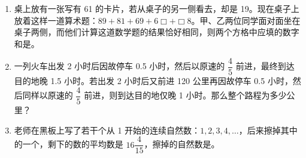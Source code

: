 \documentclass[UTF8,12pt,a4paper]{ctexart}
\newcommand{\BottomWriteSpace}{0.5cm}
\newenvironment{OnePageEightFill}{
  \small
  \vspace*{0pt}
  \begin{enumerate}[leftmargin=*, itemsep=0pt, topsep=0pt, parsep=0pt, partopsep=0pt]
  \setlength{\parskip}{0pt}
}{
  \end{enumerate}
  \vspace*{\BottomWriteSpace}
  \normalsize
  \newpage
}
\newcommand{\Q}[1]{\item #1\par\vfill}
\newcommand{\Qlast}[1]{\item #1\par}
\begin{document}
\begin{OnePageEightFill}
\Q{桌上放有一张写有 61 的卡片，若从桌子的另一侧看去，却是 19。现在桌子上放着这样一道算术题：$89 + 81 + 69 + 6\Box + \Box8$。甲、乙两位同学面对面坐在桌子两侧，而他们计算这道数学题的结果恰好相同，则两个方格中应填的数字和是\underline{\hspace{3em}}。}

\Q{一列火车出发 2 小时后因故停车 0.5 小时，然后以原速的 $\dfrac{4}{5}$ 前进，最终到达目的地晚 1.5 小时。若出发 2 小时后又前进 120 公里再因故停车 0.5 小时，然后同样以原速的 $\dfrac{4}{5}$ 前进，则到达目的地仅晚 1 小时。那么整个路程为多少公里？}

\Qlast{老师在黑板上写了若干个从 1 开始的连续自然数：$1, 2, 3, 4, \dots$，后来擦掉其中的一个，剩下的数的平均数是 $16\dfrac{4}{15}$，擦掉的自然数是\underline{\hspace{3em}}。}

\end{OnePageEightFill}

\end{document}
